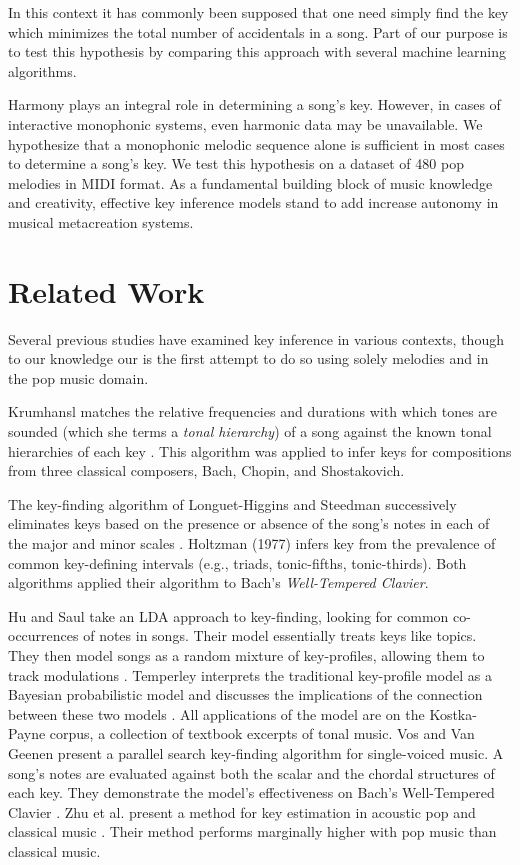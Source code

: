 \documentclass[letterpaper]{article}
\begin{document}
In this context it has commonly been supposed that one need simply find the key which minimizes the total number of accidentals in a song. Part of our purpose is to test this hypothesis by comparing this approach with several machine learning algorithms.

Harmony plays an integral role in determining a song's key. However, in cases of interactive monophonic systems, even harmonic data may be unavailable. We hypothesize that a monophonic melodic sequence alone is sufficient in most cases to determine a song's key. We test this hypothesis on a dataset of 480 pop melodies in MIDI format. As a fundamental building block of music knowledge and creativity, effective key inference models stand to add increase autonomy in musical metacreation systems.

\section{Related Work}

Several previous studies have examined key inference in various contexts, though to our knowledge our is the first attempt to do so using solely melodies and in the pop music domain.

Krumhansl matches the relative frequencies and durations with which tones are sounded (which she terms a \emph{tonal hierarchy}) of a song against the known tonal hierarchies of each key \cite{krumhansl2001cognitive}. This algorithm was applied to infer keys for compositions from three classical composers, Bach, Chopin, and Shostakovich. 

The key-finding algorithm of Longuet-Higgins and Steedman successively eliminates keys based on the presence or absence of the song's notes in each of the major and minor scales \cite{longuet1971interpreting}. Holtzman (1977) infers key from the prevalence of common key-defining intervals (e.g., triads, tonic-fifths, tonic-thirds). Both algorithms applied their algorithm to Bach's \emph{Well-Tempered Clavier}.

Hu and Saul take an LDA approach to key-finding, looking for common co-occurrences of notes in songs. Their model essentially treats keys like topics. They then model songs as a random mixture of key-profiles, allowing them to track modulations \cite{hu2009probabilistic}. Temperley interprets the traditional key-profile model as a Bayesian probabilistic model and discusses the implications of the connection between these two models \cite{temperley2002bayesian}. All applications of the model are on the Kostka-Payne corpus, a collection of textbook excerpts of tonal music. Vos and Van Geenen present a parallel search key-finding algorithm for single-voiced music. A song's notes are evaluated against both the scalar and the chordal structures of each key. They demonstrate the model's effectiveness on Bach's Well-Tempered Clavier \cite{vos1996parallel}. Zhu et al. present a method for key estimation in acoustic pop and classical music \cite{zhu2005music}. Their method performs marginally higher with pop music than classical music. 
\end{document}
